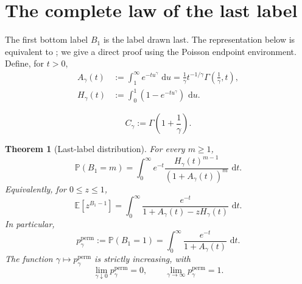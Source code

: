 \documentclass[11pt]{article}
\numberwithin{equation}{section}
\newtheorem{theorem}{Theorem}[section]
\theoremstyle{definition}
\theoremstyle{remark}
\newcommand{\Pp}{\mathbb P}
\newcommand{\Ee}{\mathbb E}
\newcommand{\dd}{\,\mathrm d}
\begin{document}
\section{The complete law of the last label}
\label{sec:lastlabel}

The first bottom label $B_1$ is the label drawn last.  The representation below is equivalent to \cite[Proposition~26]{PitmanTran}; we give a direct proof using the Poisson endpoint environment.  Define, for $t>0$,
\begin{align}
  A_\gamma(t)
  &:=\int_1^\infty e^{-tu^\gamma}\,\dd u
   =\frac1\gamma t^{-1/\gamma}
     \Gamma\!\left(\frac1\gamma,t\right),
  \label{eq:A-gamma}\\
  H_\gamma(t)
  &:=\int_0^1\left(1-e^{-tu^\gamma}\right)\,\dd u.
  \label{eq:H-gamma}
\end{align}

\begin{equation}
  C_\gamma:=\Gamma\!\left(1+\frac1\gamma\right).
  \label{eq:C-gamma}
\end{equation}

\begin{theorem}[Last-label distribution]
\label{thm:last-label}
For every $m\geq1$,
\begin{equation}
  \Pp(B_1=m)
  =\int_0^\infty
  e^{-t}\frac{H_\gamma(t)^{m-1}}
  {(1+A_\gamma(t))^m}\,\dd t.
  \label{eq:last-label-pmf}
\end{equation}
Equivalently, for $0\leq z\leq1$,
\begin{equation}
  \Ee\left[z^{B_1-1}\right]
  =\int_0^\infty
  \frac{e^{-t}}
  {1+A_\gamma(t)-zH_\gamma(t)}\,\dd t.
  \label{eq:last-label-pgf}
\end{equation}
In particular,
\begin{equation}
  p_\gamma^{\mathrm{perm}}
  :=\Pp(B_1=1)
  =\int_0^\infty
  \frac{e^{-t}}{1+A_\gamma(t)}\,\dd t.
  \label{eq:p-perm-general}
\end{equation}
The function $\gamma\mapsto p_\gamma^{\mathrm{perm}}$ is strictly increasing, with
\begin{equation}
  \lim_{\gamma\downarrow0}p_\gamma^{\mathrm{perm}}=0,
  \qquad
  \lim_{\gamma\to\infty}p_\gamma^{\mathrm{perm}}=1.
  \label{eq:p-perm-endpoints}
\end{equation}
\end{theorem}
\end{document}
